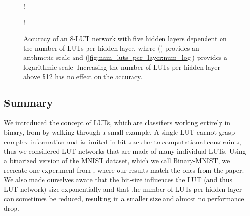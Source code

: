 \begin{figure}[!htb]
    \centering
  \begin{minipage}[b]{.45\linewidth}
     {!} {
    
    }
    \label{fig:num_luts_per_layer:num}
  \end{minipage}
  \begin{minipage}[b]{.45\linewidth}
     {!} {
    
    }
    \label{fig:num_luts_per_layer:num_log}
  \end{minipage}
  \caption{Accuracy of an 8-LUT network with five hidden layers dependent on the number of LUTs per hidden layer, where () provides an arithmetic scale and (\ref{fig:num_luts_per_layer:num_log}) provides a logarithmic scale. Increasing the number of LUTs per hidden layer above 512 has no effect on the accuracy.}
\label{fig:num_luts_per_layer}
\end{figure}
\FloatBarrier

\subsection{Summary}
We introduced the concept of LUTs, which are classifiers working entirely in binary, from \cite{bib:chatterjee2018learning} by walking through a small example. A single LUT cannot grasp complex information and is limited in bit-size due to computational constraints, thus we considered LUT networks that are made of many individual LUTs. Using a binarized version of the MNIST dataset, which we call Binary-MNIST, we recreate one experiment from \cite{bib:chatterjee2018learning}, where our results match the ones from the paper. We also made ourselves aware that the bit-size influences the LUT (and thus LUT-network) size exponentially and that the number of LUTs per hidden layer can sometimes be reduced, resulting in a smaller size and almost no performance drop.
